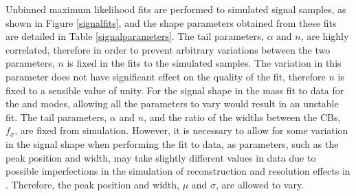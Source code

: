 Unbinned maximum likelihood fits are performed to simulated signal samples, as shown in Figure \ref{signalfits}, and the shape parameters obtained from these fits are detailed in Table \ref{signalparameters}. The tail parameters, $\alpha$ and $n$, are highly correlated, therefore in order to prevent arbitrary variations between the two parameters, $n$ is fixed in the fits to the simulated samples. The variation in this parameter does not have significant effect on the quality of the fit, therefore $n$ is fixed to a sensible value of unity. For the signal shape in the mass fit to data for the \kpi and \kpipipi modes, allowing all the parameters to vary would result in an unstable fit. The tail parameters, $\alpha$ and $n$, and the ratio of the widths between the CBs, $f_{\sigma}$, are fixed from simulation. However, it is necessary to allow for some variation in the signal shape when performing the fit to data, as parameters, such as the peak position and width, may take slightly different values in data due to possible imperfections in the simulation of reconstruction and resolution effects in \lhcb. Therefore, the peak position and width, $\mu$ and $\sigma$, are allowed to vary.

